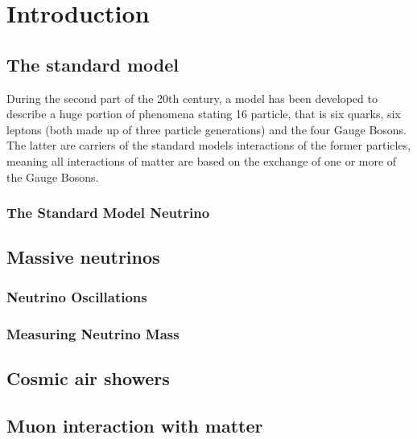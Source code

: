 
\chapter{Introduction}
\label{ch:Introduction}
    \section{The standard model}
    \label{ch:Introduction:sec:The standard model}
    During the second part of the 20th century, a model has been developed to describe a huge portion of phenomena stating 16 particle, that is six quarks, six leptons (both made up of three particle generations) and the four Gauge Bosons. The latter are carriers of the standard models interactions of the former particles, meaning all interactions of matter are based on the exchange of one or more of the Gauge Bosons.
    \subsection{The Standard Model Neutrino}
      \label{ch:Introduction:sec:Massive neutrino:subsec:The Standard Model Neutrino}
      
    
    \section{Massive neutrinos}
    \label{ch:Introduction:sec:Massive neutrino}
    
      \subsection{Neutrino Oscillations}
      \label{ch:Introduction:sec:Massive neutrino:subsec:neutrino Oscillations}
    
      \subsection{Measuring Neutrino Mass}
      \label{ch:Introduction:sec:Massive neutrino:subsec:Measuring Neutrino Mass}

    \section{Cosmic air showers}
    \label{ch:introduction:sec:Cosmic Air Showers}

    \section{Muon interaction with matter}
    \label{ch:introduction:sec:Muon interaction with matter}


